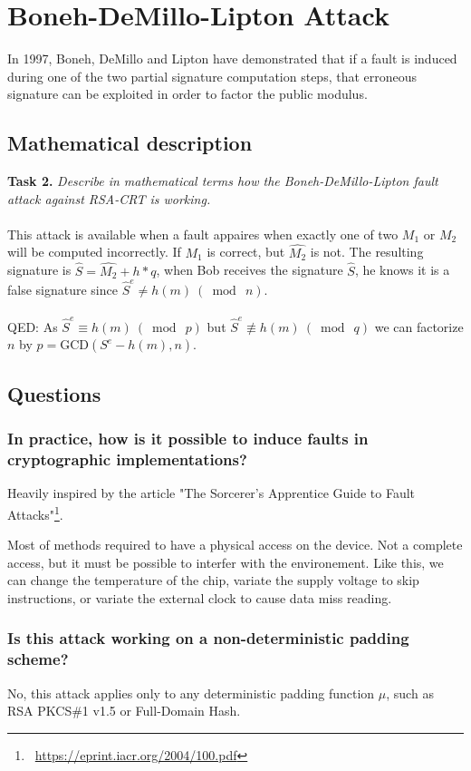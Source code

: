 \documentclass[a4paper]{report}
\begin{document}
\chapter{Boneh-DeMillo-Lipton Attack}
In 1997, Boneh, DeMillo and Lipton have demonstrated that if a fault is induced during one of the two partial signature computation steps, that erroneous signature can be exploited in order to factor the public modulus.

\section{Mathematical description}
\textbf{Task 2.} \textit{Describe in mathematical terms how the Boneh-DeMillo-Lipton fault attack against RSA-CRT is working.}
\\ \\
This attack is available when a fault appaires when exactly one of two $M_1$ or $M_2$ will be computed incorrectly. If $M_1$ is correct, but $\widehat{M_2}$ is not. The resulting signature is $\widehat{S} = \widehat{M_2} + h * q$, when Bob receives the signature $\widehat{S}$, he knows it is a false signature since $\widehat{S}^e \not= h(m)\ (\bmod\ n)$.
\\ \\
QED: As $\widehat{S}^e \equiv h(m)\ (\bmod\ p)$ but $\widehat{S}^e \not\equiv h(m)\ (\bmod\ q)$ we can factorize $n$ by $p = \textrm{GCD}(S^e - h(m), n)$.


\section{Questions}
\subsection{In practice, how is it possible to induce faults in cryptographic implementations?}
Heavily inspired by the article "The Sorcerer’s Apprentice Guide to Fault Attacks"\footnote{\ \href{https://eprint.iacr.org/2004/100.pdf}{\url{https://eprint.iacr.org/2004/100.pdf}}}.

Most of methods required to have a physical access on the device. Not a complete access, but it must be possible to interfer with the environement. Like this, we can change the temperature of the chip, variate the supply voltage to skip instructions, or variate the external clock to cause data miss reading.

\subsection{Is this attack working on a non-deterministic padding scheme?}
No, this attack applies only to any deterministic padding function $\mu$, such as RSA PKCS\#1 v1.5 or Full-Domain Hash.
\end{document}
